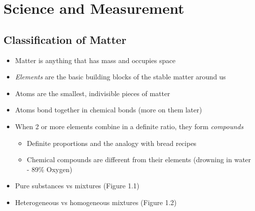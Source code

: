 \documentclass[12pt, openany, letterpaper]{memoir}
\begin{document}
\chapter{Science and Measurement}
\section{Classification of Matter}
\begin{itemize}
	\item Matter is anything that has mass and occupies space
	\item \emph{Elements} are the basic building blocks of the stable matter around us
	\item Atoms are the smallest, indivisible pieces of matter
	\item Atoms bond together in chemical bonds (more on them later)
	\item When 2 or more elements combine in a definite ratio, they form \emph{compounds}
	      \begin{itemize}
		      \item Definite proportions and the analogy with bread recipes
		      \item Chemical compounds are different from their elements (drowning in water - 89\% Oxygen)
	      \end{itemize}
	\item Pure substances vs mixtures (Figure 1.1)
	\item Heterogeneous vs homogeneous mixtures (Figure 1.2)
\end{itemize}
\end{document}
